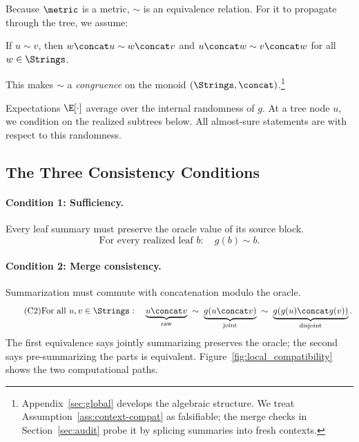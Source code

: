Because $\metric$ is a metric, $\sim$ is an equivalence relation. For it to propagate through the tree, we assume:

\begin{assumption}\label{ass:context-compat}
If $u \sim v$, then $w \concat u \sim w \concat v$ and $u \concat w \sim v \concat w$ for all $w \in \Strings$.
\end{assumption}

This makes $\sim$ a \emph{congruence} on the monoid $(\Strings, \concat)$.\footnote{Appendix~\ref{sec:global} develops the algebraic structure. We treat Assumption~\ref{ass:context-compat} as falsifiable; the merge checks in Section~\ref{sec:audit} probe it by splicing summaries into fresh contexts.}

\begin{convention}\label{conv:expectation}
Expectations $\E[\cdot]$ average over the internal randomness of $g$. At a tree node $u$, we condition on the realized subtrees below. All almost-sure statements are with respect to this randomness.
\end{convention}

\subsection{The Three Consistency Conditions}

\paragraph{Condition 1: Sufficiency.}
Every leaf summary must preserve the oracle value of its source block.
\begin{equation}\tag{C1}\label{eq:leaf_sufficiency}
\text{For every realized leaf } b: \quad g(b) \sim b.
\end{equation}

\paragraph{Condition 2: Merge consistency.}
Summarization must commute with concatenation modulo the oracle.
\begin{equation}\tag{C2}\label{eq:leaf_compatibility}
\text{For all } u, v \in \Strings: \quad
\underbrace{u \concat v}_{\text{raw}} \;\sim\;
\underbrace{g(u \concat v)}_{\text{joint}} \;\sim\;
\underbrace{g(g(u) \concat g(v))}_{\text{disjoint}}.
\end{equation}
The first equivalence says jointly summarizing preserves the oracle; the second says pre-summarizing the parts is equivalent. Figure~\ref{fig:local_compatibility} shows the two computational paths.

